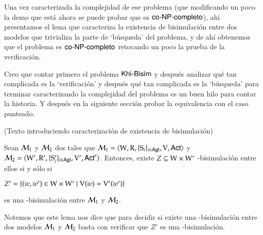 Una vez caracterizada la complejidad de ese problema (que modificando un poco la demo que está ahora se puede probar que es $\rm\textsf{co-NP-completo}$), 
ahi presentamos el lema que caracteriza la existencia de bisimulación entre dos modelos que trivializa la parte de `búsqueda' del problema, 
y de ahí obtenemos que el problema es $\rm\textsf{co-NP-completo}$ retocando un poco la prueba de la verificación.

Creo que contar primero el problema $\rm\textsf{Khi-Bisim}$ y después analizar qué tan complicada es la `verificación' y después qué tan complicada es la `búsqueda' 
para terminar caracterizando la complejidad del problema es un buen hilo para contar la historia. Y después en la siguiente sección probar la equivalencia 
con el caso punteado.


(Texto introduciendo caracterización de existencia de bisimulación)


\begin{lema}\label{lema:bisim-existence}
    Sean $\mathcal{M}_1$ y $\mathcal{M}_2$ dos \ultss tales que 
    $\mathcal{M}_1=\langle \mathrm{W},\mathrm{R},\{ \mathrm{S}_i \}_{i \in {\rm \sf Agt}},\mathrm{V},{\rm \sf Act} \rangle$ y 
    $\mathcal{M}_2=\langle \mathrm{W}',\mathrm{R}',\{ \mathrm{S}_i' \}_{i \in {\rm \sf Agt}},\mathrm{V}',{\rm \sf Act}' \rangle$.
    Entonces, existe $Z \subseteq \mathrm{W} \times \mathrm{W}'$ \KHilogic-bisimulación entre ellos si y sólo si

    \begin{center}
        $Z' = \{(w,w') \in \mathrm{W} \times \mathrm{W}' \mid \mathrm{V}(w) = \mathrm{V}'(w')\}$
    \end{center}
    es una \KHilogic-bisimulación entre $\mathcal{M}_1$ y $\mathcal{M}_2$.
\end{lema}

Notemos que este lema nos dice que para decidir si existe una \KHilogic-bisimulación
entre dos modelos $\mathcal{M}_1$ y $\mathcal{M}_2$ basta con verificar que $Z'$ es una \KHilogic-bisimulación.

